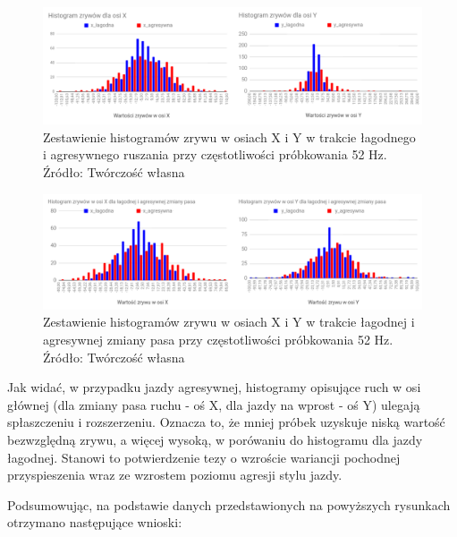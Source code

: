 \begin{figure}[H]
	\centering
	\includegraphics[width=16cm]{img/driving_analysis/histogram_zestawienie_ostre_lagodne_ruszanie.png}
	\caption{Zestawienie histogramów zrywu w osiach X i Y w trakcie łagodnego i agresywnego ruszania przy częstotliwości próbkowania 52 Hz.
	\\Źródło: Twórczość własna}
	\label{fig:image_histogram_acceleration_52Hz}
\end{figure}

\begin{figure}[H]
	\centering
	\includegraphics[width=16cm]{img/driving_analysis/histogram_zestawienie_zmiana_pasa.png}
	\caption{Zestawienie histogramów zrywu w osiach X i Y w trakcie łagodnej i agresywnej zmiany pasa przy częstotliwości próbkowania 52 Hz.
	\\Źródło: Twórczość własna}
	\label{fig:image_histogram_changing_lane_52Hz}
\end{figure}

Jak widać, w przypadku jazdy agresywnej, histogramy opisujące ruch w osi głównej (dla zmiany pasa ruchu - oś X, dla jazdy na wprost - oś Y) ulegają spłaszczeniu i rozszerzeniu. Oznacza to, że mniej próbek uzyskuje niską wartość bezwzględną zrywu, a więcej wysoką, w porówaniu do histogramu dla jazdy łagodnej. Stanowi to potwierdzenie tezy o wzroście wariancji pochodnej przyspieszenia wraz ze wzrostem poziomu agresji stylu jazdy.

Podsumowując, na podstawie danych przedstawionych na powyższych rysunkach otrzymano następujące wnioski:

